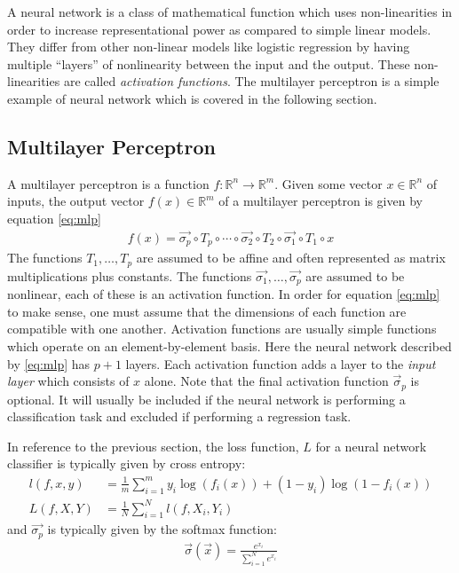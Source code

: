 A neural network is a class of mathematical function which uses non-linearities in order to increase representational power as compared to simple linear models.  They differ from other non-linear models like logistic regression by having multiple ``layers'' of nonlinearity between the input and the output.  These non-linearities are called \textit{activation functions}.  The multilayer perceptron is a simple example of neural network which is covered in the following section.

\subsection{Multilayer Perceptron}
A multilayer perceptron is a function $f:\mathbb{R}^n\rightarrow \mathbb{R}^m$. Given some vector $x\in \mathbb{R}^n$ of inputs, the output vector $f(x)\in\mathbb{R}^m$ of a multilayer perceptron is given by equation \ref{eq:mlp}
\begin{align}\label{eq:mlp}
    f(x) = \vec{\sigma_p} \circ T_p \circ\cdots\circ \vec{\sigma_2}\circ T_2\circ \vec{\sigma_1} \circ T_1\circ x
\end{align}
The functions $T_1,\dots,T_p$ are assumed to be affine and often represented as matrix multiplications plus constants.  The functions $\vec{\sigma_1},\dots,\vec{\sigma_p}$ are assumed to be nonlinear, each of these is an activation function.  In order for equation \ref{eq:mlp} to make sense, one must assume that the dimensions of each function are compatible with one another.  Activation functions are usually simple functions which operate on an element-by-element basis.  Here the neural network described by \ref{eq:mlp} has $p+1$ layers.  Each activation function adds a layer to the \textit{input layer} which consists of $x$ alone.  Note that the final activation function $\vec{\sigma}_p$ is optional.  It will usually be included if the neural network is performing a classification task and excluded if performing a regression task.

In reference to the previous section, the loss function, $L$ for a neural network classifier is typically given by cross entropy:
\begin{align}
    l(f,x,y) &= \frac{1}{m}\sum_{i=1}^m y_i\log(f_i(x)) + (1-y_i)\log(1-f_i(x))\\
    L(f,X,Y) &= \frac{1}{N}\sum_{i=1}^N l(f,X_i,Y_i)
\end{align}
 and $\vec{\sigma_p}$ is typically given by the softmax function:
\begin{align}
    \vec{\sigma}(\vec{x}) = \frac{e^{x_i}}{\sum_{i=1}^N e^{x_i}}
\end{align}
